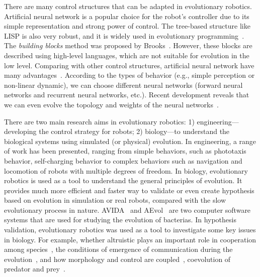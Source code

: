 There are many control structures that can be adapted in evolutionary robotics. Artificial neural network is a popular choice for the robot's controller due to its simple representation and strong power of control. The tree-based structure like LISP is also very robust, and it is widely used in evolutionary programming~\cite{Koza:1992}. The \textit{building blocks} method was proposed by Brooks~\cite{Brooks92artificiallife}. However, these blocks are described using high-level languages, which are not suitable for evolution in the low level. Comparing with other control structures, artificial neural network have many advantages~\cite{Floreano_1997, Floreano2008:NN}. According to the types of behavior (e.g., simple perception or non-linear dynamic), we can choose different neural networks (forward neural networks and recurrent neural networks, etc.). Recent development reveals that we can even evolve the topology and weights of the neural networks~\cite{Kenneth2002}. 

There are two main research aims in evolutionary robotics: 1) engineering---developing the control strategy for robots; 2) biology---to understand the biological systems using simulated (or physical) evolution. In engineering, a range of work has been presented, ranging from simple behaviors, such as phototaxis behavior, self-charging behavior to complex behaviors such as navigation and locomotion of robots with multiple degrees of freedom. In biology, evolutionary robotics is used as a tool to understand the general principles of evolution. It provides much more efficient and faster way to validate or even create hypothesis based on evolution in simulation or real robots, compared with the slow evolutionary process in nature. AVIDA~\cite{Bryson2013} and AEvol~\cite{Batut2013} are two computer software systems that are used for studying the evolution of bacterias. In hypothesis validation, evolutionary robotics was used as a tool to investigate some key issues in biology. For example, whether altruistic plays an important role in cooperation among species~\cite{montanier:inria2011,Waibel2011}, the conditions of emergence of communication during the evolution~\cite{Floreano2007514}, and how morphology and control are coupled~\cite{Auerbach:PLoS:2014}, coevolution of predator and prey~\cite{Cliff_1995, Floreano_1998}. 

